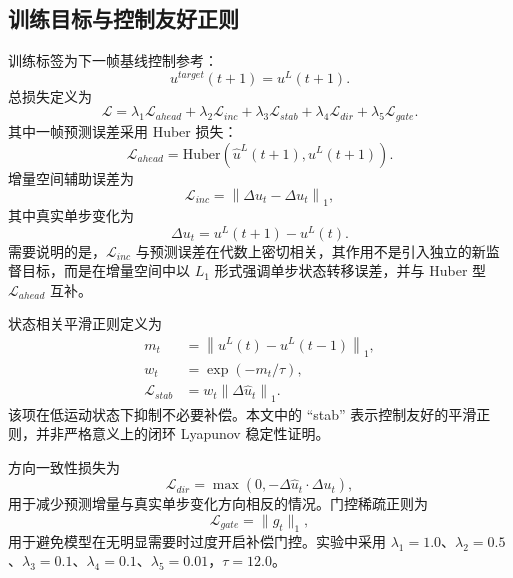 \documentclass[journal]{IEEEtran}
\begin{document}
\subsection{训练目标与控制友好正则}
训练标签为下一帧基线控制参考：
\begin{equation}
u^{target}(t+1)=u^L(t+1).
\end{equation}
总损失定义为
\begin{equation}
\mathcal{L}=\lambda_1\mathcal{L}_{ahead}+\lambda_2\mathcal{L}_{inc}+\lambda_3\mathcal{L}_{stab}+\lambda_4\mathcal{L}_{dir}+\lambda_5\mathcal{L}_{gate}.
\end{equation}
其中一帧预测误差采用 Huber 损失：
\begin{equation}
\mathcal{L}_{ahead}=\mathrm{Huber}\!\left(\hat{u}^L(t+1),u^L(t+1)\right).
\end{equation}
增量空间辅助误差为
\begin{equation}
\mathcal{L}_{inc}=\left\|\Delta\hat{u}_t-\Delta u_t\right\|_1,
\end{equation}
其中真实单步变化为
\begin{equation}
\Delta u_t=u^L(t+1)-u^L(t).
\end{equation}
需要说明的是，$\mathcal{L}_{inc}$ 与预测误差在代数上密切相关，其作用不是引入独立的新监督目标，而是在增量空间中以 $L_1$ 形式强调单步状态转移误差，并与 Huber 型 $\mathcal{L}_{ahead}$ 互补。

状态相关平滑正则定义为
\begin{equation}
\begin{aligned}
m_t&=\left\|u^L(t)-u^L(t-1)\right\|_1,\\
w_t&=\exp(-m_t/\tau),\\
\mathcal{L}_{stab}&=w_t\left\|\Delta\hat{u}_t\right\|_1.
\end{aligned}
\end{equation}
该项在低运动状态下抑制不必要补偿。本文中的 ``stab'' 表示控制友好的平滑正则，并非严格意义上的闭环 Lyapunov 稳定性证明。

方向一致性损失为
\begin{equation}
\mathcal{L}_{dir}=\max\left(0,-\Delta\hat{u}_t\cdot\Delta u_t\right),
\end{equation}
用于减少预测增量与真实单步变化方向相反的情况。门控稀疏正则为
\begin{equation}
\mathcal{L}_{gate}=\|g_t\|_1,
\end{equation}
用于避免模型在无明显需要时过度开启补偿门控。实验中采用 $\lambda_1=1.0$、$\lambda_2=0.5$、$\lambda_3=0.1$、$\lambda_4=0.1$、$\lambda_5=0.01$，$\tau=12.0$。
\end{document}
